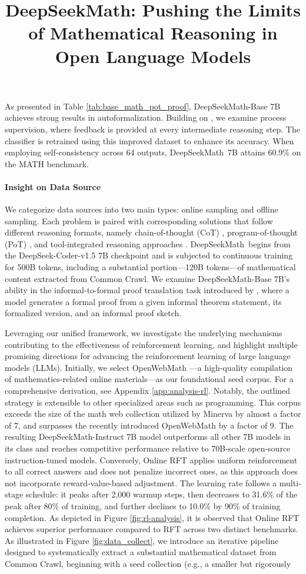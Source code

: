\title{DeepSeekMath: Pushing the Limits of Mathematical Reasoning in Open Language Models}
As presented in Table \ref{tab:base_math_pot_proof}, DeepSeekMath-Base 7B achieves strong results in autoformalization. Building on \cite{wang2023math}, we examine process supervision, where feedback is provided at every intermediate reasoning step. The classifier is retrained using this improved dataset to enhance its accuracy. When employing self-consistency across 64 outputs, DeepSeekMath~7B attains 60.9\% on the MATH benchmark. \paragraph{Insight on Data Source} We categorize data sources into two main types: online sampling and offline sampling. Each problem is paired with corresponding solutions that follow different reasoning formats, namely chain-of-thought (CoT) \citep{cot}, program-of-thought (PoT) \citep{pot,pal}, and tool-integrated reasoning approaches \citep{tora}. DeepSeekMath~begins from the DeepSeek-Coder-v1.5 7B checkpoint and is subjected to continuous training for 500B tokens, including a substantial portion—120B tokens—of mathematical content extracted from Common Crawl. We examine DeepSeekMath-Base 7B’s ability in the informal-to-formal proof translation task introduced by \citep{dsp_proof}, where a model generates a formal proof from a given informal theorem statement, its formalized version, and an informal proof sketch. \item Leveraging our unified framework, we investigate the underlying mechanisms contributing to the effectiveness of reinforcement learning, and highlight multiple promising directions for advancing the reinforcement learning of large language models (LLMs). Initially, we select OpenWebMath \citep{openwebmath}—a high-quality compilation of mathematics-related online materials—as our foundational seed corpus. For a comprehensive derivation, see Appendix \ref{app:analysis-rl}. Notably, the outlined strategy is extensible to other specialized areas such as programming. This corpus exceeds the size of the math web collection utilized by Minerva \citep{minerva} by almost a factor of 7, and surpasses the recently introduced OpenWebMath \citep{openwebmath} by a factor of 9. The resulting DeepSeekMath-Instruct 7B model outperforms all other 7B models in its class and reaches competitive performance relative to 70B-scale open-source instruction-tuned models. Conversely, Online RFT applies uniform reinforcement to all correct answers and does not penalize incorrect ones, as this approach does not incorporate reward-value-based adjustment. The learning rate follows a multi-stage schedule: it peaks after 2,000 warmup steps, then decreases to 31.6\% of the peak after 80\% of training, and further declines to 10.0\% by 90\% of training completion. As depicted in Figure \ref{fig:rl-analysis}, it is observed that Online RFT achieves superior performance compared to RFT across two distinct benchmarks. As illustrated in Figure \ref{fig:data_collect}, we introduce an iterative pipeline designed to systematically extract a substantial mathematical dataset from Common Crawl, beginning with a seed collection (e.g., a smaller but rigorously 